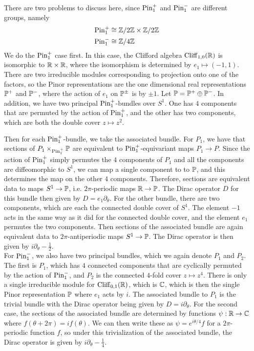 \begin{exmp}
There are two problems to discuss here, since $\Pin_1^+$ and $\Pin_1^-$ are
different groups, namely
\begin{align*}
\Pin_1^+ &\cong \Z/2\Z \times \Z / 2\Z \\
\Pin_1^- &\cong \Z/4\Z
\end{align*}
We do the $\Pin_1^+$ case first. In this case, the Clifford algebra
$\Cliff_{1,0}(\R)$ is isomorphic to $\R \times \R$, where the isomorphism is
determined by $e_1 \mapsto (-1,1)$. There are two irreducible modules corresponding
to projection onto one of the factors, so the Pinor representations are the one
dimensional real representations $\P^+$ and $\P^-$, where the action of $e_1$ on
$\P^\pm$ is by $\pm 1$. Let $\P = \P^+ \oplus \P^-$. In addition, we have two
principal $\Pin^+_1$-bundles over $S^1$. One has $4$ components that are permuted
by the action of $\Pin_1^+$, and the other has two components, which
are both the double cover $z \mapsto z^2$.

Then for each $\Pin_1^+$-bundle,
we take the associated bundle. For $P_1$, we have that sections of
$P_1 \times_{\Pin_1^+} \P$ are equivalent to $\Pin_1^+$-equivariant maps
$P_1 \to P$. Since the action of $\Pin_1^+$ simply permutes the $4$ components
of $P_1$ and all the components are diffeomorphic to $S^1$, we can map
a single component to to $\P$, and this determines the map on the other $4$
components. Therefore, sections are equivalent data to maps $S^1 \to \P$, i.e.
$2\pi$-periodic maps $\R \to \P$. The Dirac operator $D$ for this bundle then
given by $D = e_1\partial_\theta$. For the other bundle, there are two components,
which are each the connected double cover of $S^1$. The element $-1$ acts in the same
way as it did for the connected double cover, and the element $e_1$ permutes
the two components. Then sections of the associated bundle are again equivalent
data to $2\pi$-antiperiodic maps $S^1 \to \P$. The Dirac operator is then given
by $i\partial_\theta - \frac{1}{2}$. \\

For $\Pin_1^-$, we also have two principal bundles, which we again denote
$P_1$ and $P_2$. The first is $P_1$, which has $4$ connected components that are cyclically
permuted by the action of $\Pin_1^-$, and $P_2$ is the connected $4$-fold
cover $z \mapsto z^4$. There is only a single irreducible module for $\Cliff_{0,1}(\R)$,
which is $\C$, which is then the single Pinor representation $\P$ where
$e_1$ acts by $i$. The associated bundle to $P_1$ is the trivial bundle with the
Dirac operator being given by $D = i\partial_\theta$. For the second case,
the sections of the associated bundle are determined by functions
$\psi : \R \to \C$ where $f(\theta + 2\pi) = if(\theta)$. We can then write these
as $\psi = e^{i\theta/4}f$ for a $2\pi$-periodic function $f$, so under this
trivialization of the associated bundle, the Dirac operator is given by
$i\partial_\theta - \frac{1}{4}$.
\end{exmp}
%